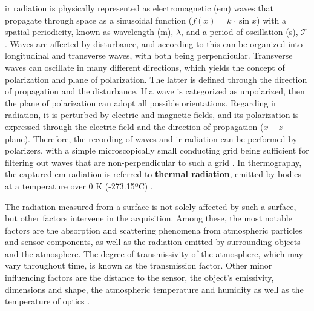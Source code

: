 \acrshort{ir} radiation is physically represented as electromagnetic (\acrshort{em}) waves that propagate through space as a sinusoidal function ($f(x) = k \cdot \sin{x}$) with a spatial periodicity, known as wavelength (\si{\meter}), $\lambda$, and a period of oscillation (\si{\second}), $\mathcal{T}$. 
Waves are affected by disturbance, and according to this can be organized into longitudinal and transverse waves, with both being perpendicular. Transverse waves can oscillate in many different directions, which yields the concept of polarization and plane of polarization. The latter is defined through the direction of propagation and the disturbance. If a wave is categorized as unpolarized, then the plane of polarization can adopt all possible orientations. Regarding \acrshort{ir} radiation, it is perturbed by electric and magnetic fields, and its polarization is expressed through the electric field and the direction of propagation ($x-z$ plane). Therefore, the recording of waves and \acrshort{ir} radiation can be performed by polarizers, with a simple microscopically small conducting grid being sufficient for filtering out waves that are non-perpendicular to such a grid \cite{vollmer_infrared_2017}. In thermography, the captured \acrshort{em} radiation is referred to \textbf{thermal radiation}, emitted by bodies at a temperature over 0 \si{\kelvin} (-273.15ºC) \cite{vollmer_infrared_2017, emery_introduction_2017}. 

The radiation measured from a surface is not solely affected by such a surface, but other factors intervene in the acquisition. Among these, the most notable factors are the absorption and scattering phenomena from atmospheric particles and sensor components, as well as the radiation emitted by surrounding objects and the atmosphere. The degree of transmissivity of the atmosphere, which may vary throughout time, is known as the transmission factor. Other minor influencing factors are the distance to the sensor, the object's emissivity, dimensions and shape, the atmospheric temperature and humidity as well as the temperature of optics \cite{vollmer_infrared_2017}. 

